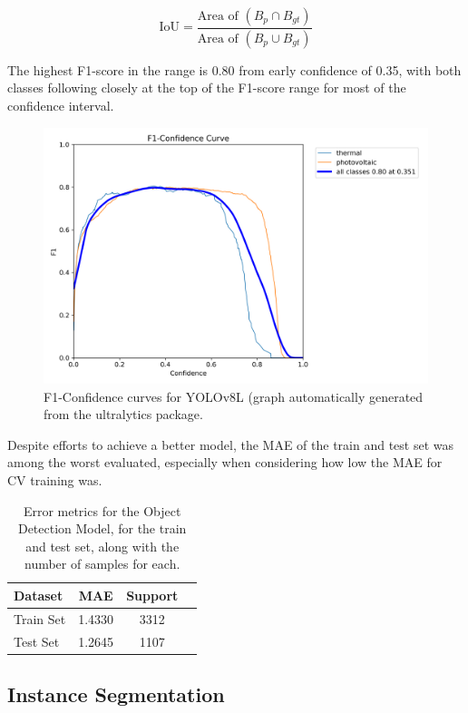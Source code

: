 \documentclass[conference]{IEEEtran}
\begin{document}
\[
\text{IoU} = \frac{\text{Area of } (B_p \cap B_{gt})}{\text{Area of } (B_p \cup B_{gt})}
\]

The highest F1-score in the range is 0.80 from early confidence of 0.35, with both classes following closely at the top of the F1-score range for most of the confidence interval.

\begin{figure}[H]
    \centering
    \includegraphics[width=1\linewidth]{assets/model03_yolof1.png}
    \caption{F1-Confidence curves for YOLOv8L (graph automatically generated from the ultralytics package.}
    \label{fig:model03_yolof1}
\end{figure}

Despite efforts to achieve a better model, the MAE of the train and test set was among the worst evaluated, especially when considering how low the MAE for CV training was.

\begin{table}[H]
\centering
\caption{Error metrics for the Object Detection Model, for the train and test set, along with the number of samples for each.}
\label{tab:model03_results}
\begin{tabular}{lccc}
\toprule
\textbf{Dataset} & \textbf{MAE} & \textbf{Support} \\
\midrule
Train Set & 1.4330 & 3312 \\
Test Set & 1.2645 & 1107 \\
\bottomrule
\end{tabular}
\end{table}

\subsection{Instance Segmentation}
\end{document}
